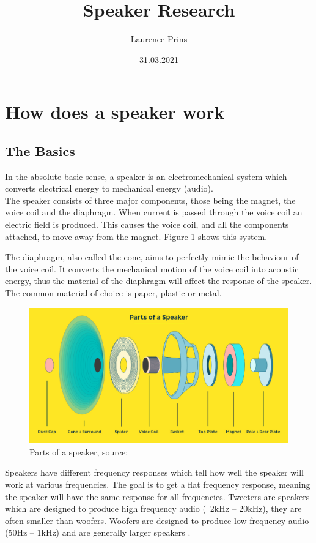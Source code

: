 \documentclass[12pt, a4paper]{article}
\title{Speaker Research}
\author{Laurence Prins}
\date{31.03.2021}
\begin{document}
	\maketitle
	\section{How does a speaker work}
	\subsection{The Basics}
	In the absolute basic sense, a speaker is an electromechanical system which converts electrical energy to mechanical energy (audio). \\
	
	The speaker consists of three major components, those being the magnet, the voice coil and the diaphragm. When current is passed through the voice coil an electric field is produced. This causes the voice coil, and all the components attached, to move away from the magnet\cite{howSpeaker}. Figure \ref{fig1:speakerexploded} shows this system. 
	
	The diaphragm, also called the cone, aims to perfectly mimic the behaviour of the voice coil. It converts the mechanical motion of the voice coil into acoustic energy, thus the material of the diaphragm will affect the response of the speaker. The common material of choice is paper, plastic or metal\cite{speakerDiaphragm}.
	
	\begin{figure}[!htb]
		\includegraphics[width=\textwidth]{./Figures/parts_of_a_speaker}
		\caption{Parts of a speaker, source: \cite{howSpeaker}}
		\label{fig1:speakerexploded}
	\end{figure}
	Speakers have different frequency responses which tell how well the speaker will work at various frequencies. The goal is to get a flat frequency response, meaning the speaker will have the same response for all frequencies. Tweeters are speakers which are designed to produce high frequency audio (~2kHz – 20kHz), they are often smaller than woofers. Woofers are designed to produce low frequency audio (50Hz – 1kHz) and are generally larger speakers \cite{speakerTypes}.
\end{document}
